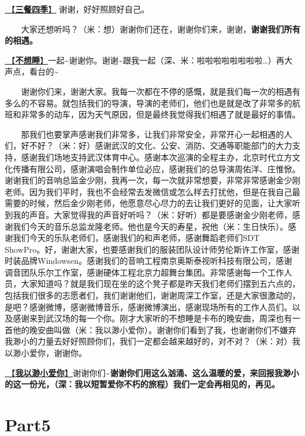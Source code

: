 \documentclass[]{ctexbook}
\begin{document}
\hyperref[three-meals-a-day]{🎵【\textbf{三餐四季}】} 谢谢，好好照顾好自己。

  大家还想听吗？（米：想）谢谢你们还在，谢谢你们来，谢谢，\textbf{谢谢我们所有的相遇。}

\hyperref[keep-playing]{🎵【\textbf{不想睡}】}一起\textasciitilde 谢谢你。谢谢\textasciitilde 跟我一起（深、米：啦啦啦啦啦啦啦啦\ldots）再大声点，看台的\textasciitilde{}

  谢谢你们来，谢谢大家。我每一次都在不停的感慨，就是我们每一次的相遇有多么的不容易。就包括我们的导演，导演的老师们，他们也是就是改了非常多的航班和非常多的动车，因为天气原因，但是最终我觉得我们相遇了就是最好的事情。

  那我们也要掌声感谢我们非常多，让我们非常安全，非常开心一起相遇的人们，好不好？（米：好）感谢武汉的文化、公安、消防、交通等职能部门的大力支持，感谢我们场地支持武汉体育中心。感谢本次巡演的全程主办，北京时代立方文化传播有限公司，感谢演唱会制作单位必应，感谢我们的总导演周佑洋、庄惟惞。谢谢我们的音响总监金少刚，我再一次，每一次就非常想要，非常非常感谢金少刚老师。因为我们平时，我也不会经常去发微信或怎么样去打扰他，但是在我自己最需要的时候，然后金少刚老师，他愿意尽心尽力的去让我们更好的见面，让大家听到我的声音。大家觉得我的声音好听吗？（米：好听）都是要感谢金少刚老师，感谢我们今天的音乐总监龙隆老师。他也是今天的寿星，祝他（米：生日快乐）。感谢我们今天的乐队老师们，感谢我们的和声老师，感谢舞蹈老师们SDT ShowPro。好，谢谢大家，也要感谢我们的服装团队设计师劳伦斯许工作室，感谢时装品牌Windowsen。感谢我们的音响工程南京奥斯泰视听科技有限公司，感谢调音团队乐尔工作室，感谢硬体工程北京力超舞台集团。非常感谢每一个工作人员，大家知道吗？就是我们现在坐的这个凳子都是昨天我们老师们摆到五六点的，包括我们很多的志愿者们，我们谢谢他们，谢谢周深工作室，还是大家很激动的，是吧？感谢微博，感谢微博音乐，感谢微博演出，感谢现场所有的工作人员们。以及感谢来到武汉场的每一个你。刚才大家听的不想睡是卡布的晚安曲，周深也有一首他的晚安曲叫做（米：我以渺小爱你）。谢谢你们看到了我，也谢谢你们不嫌弃我渺小的力量去好好照顾你们，我们一定都会越来越好的，对不对？（米：对）我以渺小爱你，谢谢你。

\hyperref[loving-you-in-my-humble-way]{🎵【\textbf{我以渺小爱你}】}谢谢你们\textasciitilde{}\textbf{谢谢你们用这么汹涌、这么温暖的爱，来回报我渺小的这一份光，（深：我以短暂爱你不朽的旅程）我们一定会再相见的，再见。}

\section{Part5}\label{wuhan-20240727-part5}
\end{document}
